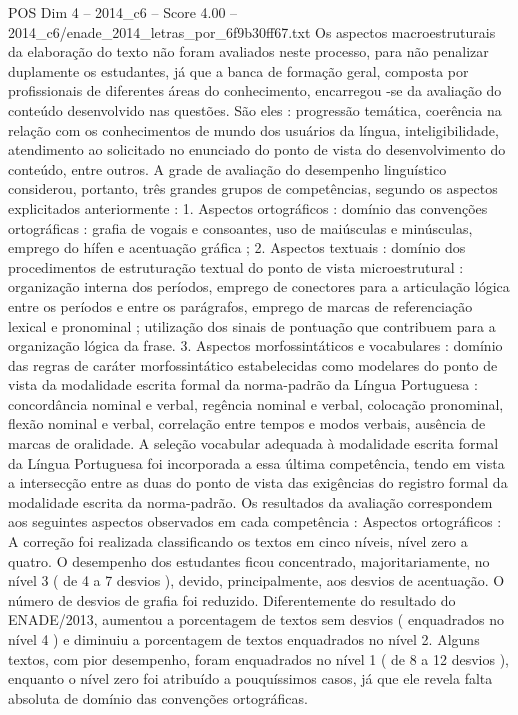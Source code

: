 \begin{textsample}{POS Dim 4 – 2014\_c6 – Score 4.00 – 2014\_c6/enade\_2014\_letras\_por\_6f9b30ff67.txt}
Os aspectos macroestruturais da elaboração do texto não foram avaliados neste processo, para não penalizar duplamente os estudantes, já que a banca de formação geral, composta por profissionais de diferentes áreas do conhecimento, encarregou -se da avaliação do conteúdo desenvolvido nas questões.
São eles : progressão temática, coerência na relação com os conhecimentos de mundo dos usuários da língua, inteligibilidade, atendimento ao solicitado no enunciado do ponto de vista do desenvolvimento do conteúdo, entre outros.
A grade de avaliação do desempenho linguístico considerou, portanto, três grandes grupos de competências, segundo os aspectos explicitados anteriormente : 1.
Aspectos ortográficos : domínio das convenções ortográficas : grafia de vogais e consoantes, uso de maiúsculas e minúsculas, emprego do hífen e acentuação gráfica ; 2.
Aspectos textuais : domínio dos procedimentos de estruturação textual do ponto de vista microestrutural : organização interna dos períodos, emprego de conectores para a articulação lógica entre os períodos e entre os parágrafos, emprego de marcas de referenciação lexical e pronominal ; utilização dos sinais de pontuação que contribuem para a organização lógica da frase. 3.
Aspectos morfossintáticos e vocabulares : domínio das regras de caráter morfossintático estabelecidas como modelares do ponto de vista da modalidade escrita formal da norma-padrão da Língua Portuguesa : concordância nominal e verbal, regência nominal e verbal, colocação pronominal, flexão nominal e verbal, correlação entre tempos e modos verbais, ausência de marcas de oralidade.
A seleção vocabular adequada à modalidade escrita formal da Língua Portuguesa foi incorporada a essa última competência, tendo em vista a intersecção entre as duas do ponto de vista das exigências do registro formal da modalidade escrita da norma-padrão.
Os resultados da avaliação correspondem aos seguintes aspectos observados em cada competência : Aspectos ortográficos : A correção foi realizada classificando os textos em cinco níveis, nível zero a quatro.
O desempenho dos estudantes ficou concentrado, majoritariamente, no nível 3 ( de 4 a 7 desvios ), devido, principalmente, aos desvios de acentuação.
O número de desvios de grafia foi reduzido.
Diferentemente do resultado do ENADE/2013, aumentou a porcentagem de textos sem desvios ( enquadrados no nível 4 ) e diminuiu a porcentagem de textos enquadrados no nível 2.
Alguns textos, com pior desempenho, foram enquadrados no nível 1 ( de 8 a 12 desvios ), enquanto o nível zero foi atribuído a pouquíssimos casos, já que ele revela falta absoluta de domínio das convenções ortográficas.

\end{textsample}
